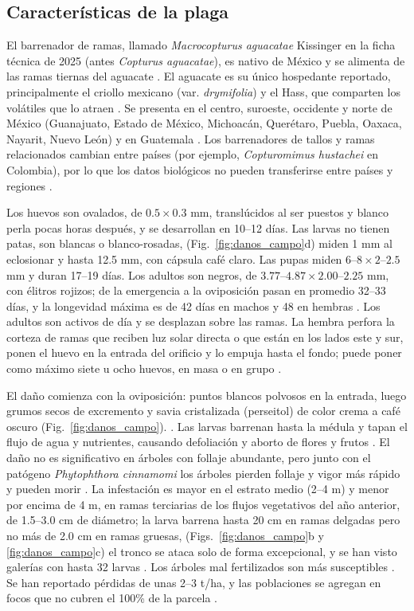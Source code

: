 \documentclass[conference]{IEEEtran}
\begin{document}
\subsection{Características de la plaga}
El barrenador de ramas, llamado \textit{Macrocopturus aguacatae} Kissinger en la ficha técnica de 2025 (antes \textit{Copturus aguacatae}), es nativo de México y se alimenta de las ramas tiernas del aguacate \cite{ref6}. El aguacate es su único hospedante reportado, principalmente el criollo mexicano (var. \textit{drymifolia}) y el Hass, que comparten los volátiles que lo atraen \cite{ref6}. Se presenta en el centro, suroeste, occidente y norte de México (Guanajuato, Estado de México, Michoacán, Querétaro, Puebla, Oaxaca, Nayarit, Nuevo León) y en Guatemala \cite{ref6, ref2}. Los barrenadores de tallos y ramas relacionados cambian entre países (por ejemplo, \textit{Copturomimus hustachei} en Colombia), por lo que los datos biológicos no pueden transferirse entre países y regiones \cite{ref7}.

Los huevos son ovalados, de $0.5 \times 0.3$ mm, translúcidos al ser puestos y blanco perla pocas horas después, y se desarrollan en 10--12 días. Las larvas no tienen patas, son blancas o blanco-rosadas,
(Fig.~\ref{fig:danos_campo}d)
miden 1 mm al eclosionar y hasta 12.5 mm, con cápsula café claro. Las pupas miden $6\text{--}8 \times 2\text{--}2.5$ mm y duran 17--19 días. Los adultos son negros, de $3.77\text{--}4.87 \times 2.00\text{--}2.25$ mm, con élitros rojizos; de la emergencia a la oviposición pasan en promedio 32--33 días, y la longevidad máxima es de 42 días en machos y 48 en hembras \cite{ref6}. Los adultos son activos de día y se desplazan sobre las ramas. La hembra perfora la corteza de ramas que reciben luz solar directa o que están en los lados este y sur, ponen el huevo en la entrada del orificio y lo empuja hasta el fondo; puede poner como máximo siete u ocho huevos, en masa o en grupo \cite{ref6}.

El daño comienza con la oviposición: puntos blancos polvosos en la entrada, luego grumos secos de excremento y savia cristalizada (perseitol) de color crema a café oscuro \cite{ref6, ref8}
(Fig.~\ref{fig:danos_campo}).
. Las larvas barrenan hasta la médula y tapan el flujo de agua y nutrientes, causando defoliación y aborto de flores y frutos \cite{ref6}. El daño no es significativo en árboles con follaje abundante, pero junto con el patógeno \textit{Phytophthora cinnamomi} los árboles pierden follaje y vigor más rápido y pueden morir \cite{ref6}. La infestación es mayor en el estrato medio (2--4 m) y menor por encima de 4 m, en ramas terciarias de los flujos vegetativos del año anterior, de 1.5--3.0 cm de diámetro; la larva barrena hasta 20 cm en ramas delgadas pero no más de 2.0 cm en ramas gruesas,
(Figs.~\ref{fig:danos_campo}b y \ref{fig:danos_campo}c)
el tronco se ataca solo de forma excepcional, y se han visto galerías con hasta 32 larvas \cite{ref6}. Los árboles mal fertilizados son más susceptibles \cite{ref6, ref9}. Se han reportado pérdidas de unas 2--3 t/ha, y las poblaciones se agregan en focos que no cubren el 100\% de la parcela \cite{ref8}.
\end{document}
